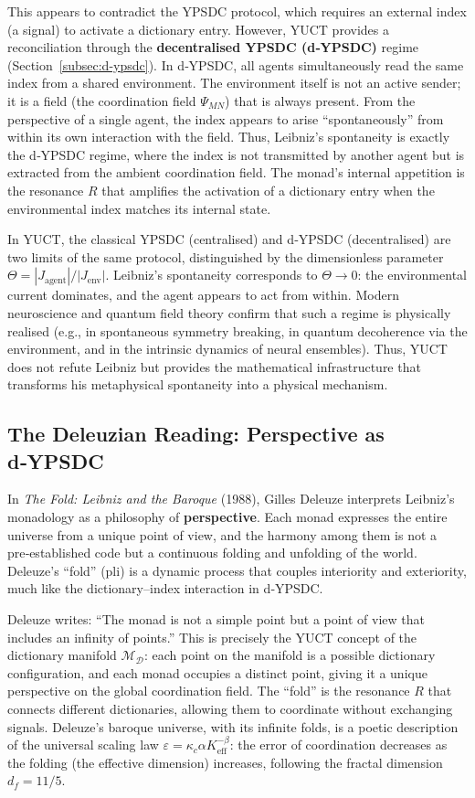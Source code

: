 \documentclass[12pt,a4paper]{article}
\begin{document}
	This appears to contradict the YPSDC protocol, which requires an external index (a signal) to activate a dictionary entry. However, YUCT provides a reconciliation through the \textbf{decentralised YPSDC (d‑YPSDC)} regime (Section~\ref{subsec:d-ypsdc}). In d‑YPSDC, all agents simultaneously read the same index from a shared environment. The environment itself is not an active sender; it is a field (the coordination field \(\Psi_{MN}\)) that is always present. From the perspective of a single agent, the index appears to arise “spontaneously” from within its own interaction with the field. Thus, Leibniz’s spontaneity is exactly the d‑YPSDC regime, where the index is not transmitted by another agent but is extracted from the ambient coordination field. The monad’s internal appetition is the resonance \(R\) that amplifies the activation of a dictionary entry when the environmental index matches its internal state.
	
	In YUCT, the classical YPSDC (centralised) and d‑YPSDC (decentralised) are two limits of the same protocol, distinguished by the dimensionless parameter \(\Theta = |J_{\mathrm{agent}}|/|J_{\mathrm{env}}|\). Leibniz’s spontaneity corresponds to \(\Theta \to 0\): the environmental current dominates, and the agent appears to act from within. Modern neuroscience and quantum field theory confirm that such a regime is physically realised (e.g., in spontaneous symmetry breaking, in quantum decoherence via the environment, and in the intrinsic dynamics of neural ensembles). Thus, YUCT does not refute Leibniz but provides the mathematical infrastructure that transforms his metaphysical spontaneity into a physical mechanism.
	
	\subsection{The Deleuzian Reading: Perspective as d‑YPSDC}
	
	In \emph{The Fold: Leibniz and the Baroque} (1988), Gilles Deleuze interprets Leibniz’s monadology as a philosophy of \textbf{perspective}. Each monad expresses the entire universe from a unique point of view, and the harmony among them is not a pre‑established code but a continuous folding and unfolding of the world. Deleuze’s “fold” (pli) is a dynamic process that couples interiority and exteriority, much like the dictionary–index interaction in d‑YPSDC.
	
	Deleuze writes: “The monad is not a simple point but a point of view that includes an infinity of points.” This is precisely the YUCT concept of the dictionary manifold \(\mathcal{M}_{\mathcal{D}}\): each point on the manifold is a possible dictionary configuration, and each monad occupies a distinct point, giving it a unique perspective on the global coordination field. The “fold” is the resonance \(R\) that connects different dictionaries, allowing them to coordinate without exchanging signals. Deleuze’s baroque universe, with its infinite folds, is a poetic description of the universal scaling law \(\varepsilon = \kappa_c \alpha K_{\mathrm{eff}}^{-\beta}\): the error of coordination decreases as the folding (the effective dimension) increases, following the fractal dimension \(d_f = 11/5\).
	
\end{document}
